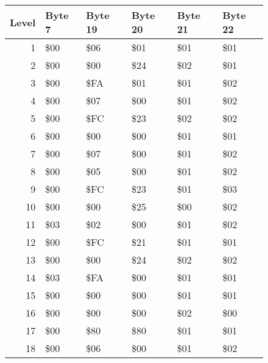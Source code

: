 \begin{figure}[H]
  {
    \setlength{\tabcolsep}{3.0pt}
    \setlength\cmidrulewidth{\heavyrulewidth} %
    \begin{adjustbox}{width=\textwidth}

      \begin{tabular}{rlllll}
        \toprule
        Level & Byte 7    & Byte 19   & Byte 20   & Byte 21   & Byte 22   \\
        \midrule
        1 & \$00       & \$06       & \$01       & \$01       & \$01       \\
        2 & \$00       & \$00       & \$24       & \$02       & \$01       \\
        3 & \$00       & \$FA       & \$01       & \$01       & \$02       \\
        4 & \$00       & \$07       & \$00       & \$01       & \$02       \\
        5 & \$00       & \$FC       & \$23       & \$02       & \$02       \\
        6 & \$00       & \$00       & \$00       & \$01       & \$01       \\
        7 & \$00       & \$07       & \$00       & \$01       & \$02       \\
        8 & \$00       & \$05       & \$00       & \$01       & \$02       \\
        9 & \$00       & \$FC       & \$23       & \$01       & \$03       \\
        10 & \$00       & \$00       & \$25       & \$00       & \$02       \\
        11 & \$03       & \$02       & \$00       & \$01       & \$02       \\
        12 & \$00       & \$FC       & \$21       & \$01       & \$01       \\
        13 & \$00       & \$00       & \$24       & \$02       & \$02       \\
        14 & \$03       & \$FA       & \$00       & \$01       & \$01       \\
        15 & \$00       & \$00       & \$00       & \$01       & \$01       \\
        16 & \$00       & \$00       & \$00       & \$02       & \$00       \\
        17 & \$00       & \$80       & \$80       & \$01       & \$01       \\
        18 & \$00       & \$06       & \$00       & \$01       & \$02       \\

\end{tabular}
\end{adjustbox}}
\end{figure}
